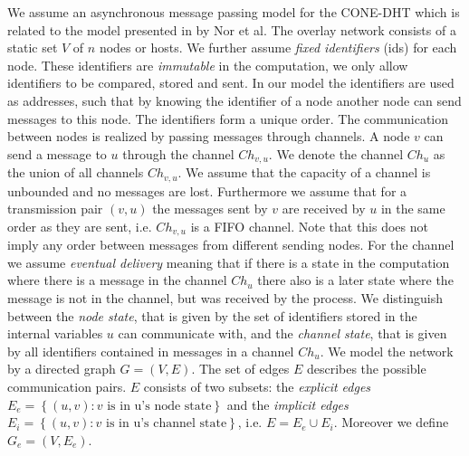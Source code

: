 \documentclass[11pt]{article}
\begin{document}
We assume an asynchronous message passing model for the CONE-DHT which is
related to the model presented in \cite{NNS11:corona} by Nor et al. The
overlay network consists of a static set $V$ of $n$ nodes or hosts. We further
assume \emph{fixed identifiers} (ids) for each node. These identifiers are
\emph{immutable} in the computation, we only allow identifiers to be compared,
stored and sent. In our model the identifiers are used as addresses, such that
by knowing the identifier of a node another node can send messages to this
node. The identifiers form a unique order. The communication between nodes is
realized by passing messages through channels. A node $v$ can send a message
to $u$ through the channel $Ch_{v,u}$. We denote the channel $Ch_u$ as the
union of all channels $Ch_{v,u}$. We assume that the capacity of a channel is
unbounded and no messages are lost. Furthermore we assume that for a
transmission pair $(v,u)$ the messages sent by $v$ are received by $u$ in the
same order as they are sent, i.e. $Ch_{v,u}$ is a FIFO channel. Note that this
does not imply any order between messages from different sending nodes. For
the channel we assume \emph{eventual delivery} meaning that if there is a
state in the computation where there is a message in the channel $Ch_u$ there
also is a later state where the message is not in the channel, but was
received by the process. We distinguish between the \emph{node state}, that is
given by the set of identifiers stored in the internal variables $u$ can communicate with, and the \emph{channel state}, that is
given by all identifiers contained in messages in a channel $Ch_u$. We
model the network by a directed graph $G=\left(V,E\right)$. The set of edges
$E$ describes the possible communication pairs. $E$ consists of two subsets:
the \emph{explicit edges} $E_e=\left\{\left(u,v\right): v \text{ is in u's
node state}\right\}$ and the \emph{implicit edges}
$E_i=\left\{\left(u,v\right): v \text{ is in u's channel state}\right\}$, i.e.
$E= E_e \cup E_i$. Moreover we define $G_e=\left(V,E_e\right)$.
\end{document}
